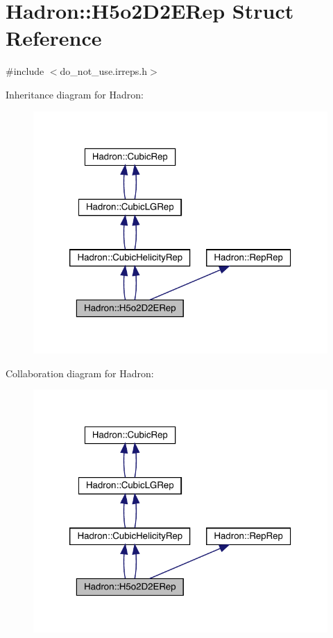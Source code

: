 \hypertarget{structHadron_1_1H5o2D2ERep}{}\section{Hadron\+:\+:H5o2\+D2\+E\+Rep Struct Reference}
\label{structHadron_1_1H5o2D2ERep}


{\ttfamily \#include $<$do\+\_\+not\+\_\+use.\+irreps.\+h$>$}



Inheritance diagram for Hadron\+:\nopagebreak
\begin{figure}[H]
\begin{center}
\leavevmode
\includegraphics[width=320pt]{d7/d6e/structHadron_1_1H5o2D2ERep__inherit__graph}
\end{center}
\end{figure}


Collaboration diagram for Hadron\+:\nopagebreak
\begin{figure}[H]
\begin{center}
\leavevmode
\includegraphics[width=320pt]{d7/d73/structHadron_1_1H5o2D2ERep__coll__graph}
\end{center}
\end{figure}
